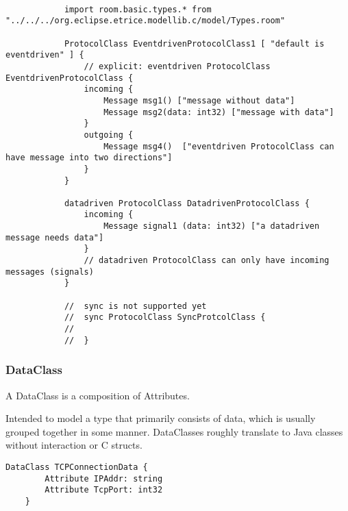 			\begin{lstlisting}[language=ROOM]
		
			import room.basic.types.* from "../../../org.eclipse.etrice.modellib.c/model/Types.room"
		
			ProtocolClass EventdrivenProtocolClass1 [ "default is eventdriven" ] {
				// explicit: eventdriven ProtocolClass EventdrivenProtocolClass {
				incoming {
					Message msg1() ["message without data"]
					Message msg2(data: int32) ["message with data"]
				}
				outgoing {
					Message msg4()  ["eventdriven ProtocolClass can have message into two directions"]
				}
			}
		
			datadriven ProtocolClass DatadrivenProtocolClass {
				incoming {
					Message signal1 (data: int32) ["a datadriven message needs data"]
				}
				// datadriven ProtocolClass can only have incoming messages (signals)
			}
			
			//  sync is not supported yet
			//	sync ProtocolClass SyncProtcolClass { 
			//		
			//	}
			\end{lstlisting}
	
	\vspace{\baselineskip}
	\vspace{\baselineskip}
	\vspace{\baselineskip}
	
\subsubsection{DataClass}
	\hypertarget{ref:DataClass}{}
	A DataClass is a composition of Attributes.
		
	Intended to model a type that primarily consists of data, which is usually grouped together in some manner. DataClasses roughly translate to Java classes without interaction or C \textsf{struct}s.
	
	\begin{lstlisting}[language=ROOM]		
	DataClass TCPConnectionData {
		Attribute IPAddr: string
		Attribute TcpPort: int32
	}
	\end{lstlisting}
		
